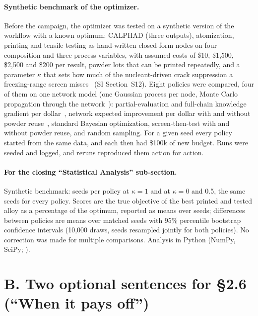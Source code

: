 \documentclass[11pt]{article}
\let\cite\autocite
\begin{document}
\paragraph{Synthetic benchmark of the optimizer.} Before the campaign, the
optimizer was tested on a synthetic version of the workflow with a known
optimum: CALPHAD (three outputs), atomization, printing and tensile testing as
hand-written closed-form nodes on four composition and three process variables,
with assumed costs of \$10, \$1,500, \$2,500 and \$200 per result, powder lots
that can be printed repeatedly, and a parameter $\kappa$ that sets how much of
the nucleant-driven crack suppression a freezing-range screen
misses~\cite{martin2017,kou2015} (SI Section~S12). Eight policies were compared, four of them on one network
model (one Gaussian process per node, Monte Carlo propagation through the
network~\cite{astudillo2021,balandat2020}): partial-evaluation and full-chain
knowledge gradient per dollar~\cite{buathong2024}, network expected improvement
per dollar with and without powder reuse~\cite{astudillo2021}, standard Bayesian
optimization, screen-then-test with and without powder reuse, and random
sampling. For a given seed every policy started from the same data, and each
then had \$100k of new budget. Runs were seeded and logged, and reruns reproduced them action for action.

\paragraph{For the closing ``Statistical Analysis'' sub-section.} Synthetic
benchmark:  seeds per policy at $\kappa=1$ and  at
$\kappa=0$ and 0.5, the same seeds for every policy. Scores are the true
objective of the best printed and tested alloy as a percentage of the optimum,
reported as means over seeds; differences between policies are means over
matched seeds with 95\% percentile bootstrap confidence intervals (10,000 draws,
seeds resampled jointly for both policies). No correction was made for multiple
comparisons. Analysis in Python (NumPy, SciPy; ).

\section*{B. Two optional sentences for \S2.6 (``When it pays off'')}
\end{document}
